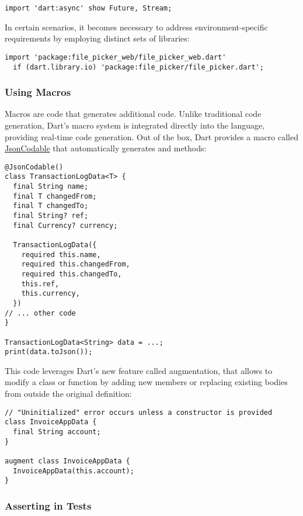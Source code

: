 \begin{lstlisting}
import 'dart:async' show Future, Stream;
\end{lstlisting}

\noindent In certain scenarios, it becomes necessary to address environment-specific requirements by employing distinct
sets of libraries:

\begin{lstlisting}
import 'package:file_picker_web/file_picker_web.dart'
  if (dart.library.io) 'package:file_picker/file_picker.dart';
\end{lstlisting}


\newpage
\subsubsection{Using Macros}

Macros are code that generates additional code. Unlike traditional code generation, Dart's macro system is integrated
directly into the language, providing real-time code generation. Out of the box, Dart provides a macro called
\href{https://dart.dev/go/json-codable}{JsonCodable} that automatically generates  and  methods:

\begin{lstlisting}
@JsonCodable()
class TransactionLogData<T> {
  final String name;
  final T changedFrom;
  final T changedTo;
  final String? ref;
  final Currency? currency;

  TransactionLogData({
    required this.name,
    required this.changedFrom,
    required this.changedTo,
    this.ref,
    this.currency,
  })
// ... other code
}

TransactionLogData<String> data = ...;
print(data.toJson());
\end{lstlisting}

\noindent This code leverages Dart's new feature called augmentation, that allows to modify a class or function by
adding new members or replacing existing bodies from outside the original definition:

\begin{lstlisting}
// "Uninitialized" error occurs unless a constructor is provided
class InvoiceAppData {
  final String account;
}

augment class InvoiceAppData {
  InvoiceAppData(this.account);
}
\end{lstlisting}


\newpage
\subsubsection{Asserting in Tests}

